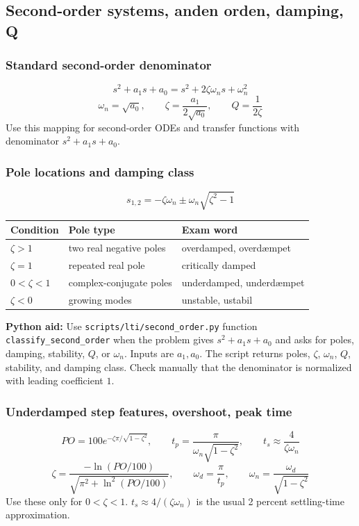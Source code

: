 \subsection{Second-order systems, anden orden, damping, Q}

\subsubsection{Standard second-order denominator}
\[
s^2+a_1s+a_0=s^2+2\zeta\omega_n s+\omega_n^2
\]
\[
\omega_n=\sqrt{a_0},\qquad
\zeta=\frac{a_1}{2\sqrt{a_0}},\qquad
Q=\frac{1}{2\zeta}
\]
Use this mapping for second-order ODEs and transfer functions with denominator \(s^2+a_1s+a_0\).

\subsubsection{Pole locations and damping class}
\[
s_{1,2}=-\zeta\omega_n\pm \omega_n\sqrt{\zeta^2-1}
\]
\begin{tabular}{lll}
\toprule
Condition & Pole type & Exam word \\
\midrule
\(\zeta>1\) & two real negative poles & overdamped, overdæmpet \\
\(\zeta=1\) & repeated real pole & critically damped \\
\(0<\zeta<1\) & complex-conjugate poles & underdamped, underdæmpet \\
\(\zeta<0\) & growing modes & unstable, ustabil \\
\bottomrule
\end{tabular}

\textbf{Python aid:} Use \texttt{scripts/lti/second\_order.py} function \texttt{classify\_second\_order} when the problem gives \(s^2+a_1s+a_0\) and asks for poles, damping, stability, \(Q\), or \(\omega_n\). Inputs are \(a_1,a_0\). The script returns poles, \(\zeta\), \(\omega_n\), \(Q\), stability, and damping class. Check manually that the denominator is normalized with leading coefficient \(1\).

\subsubsection{Underdamped step features, overshoot, peak time}
\[
PO=100e^{-\zeta\pi/\sqrt{1-\zeta^2}},\qquad
t_p=\frac{\pi}{\omega_n\sqrt{1-\zeta^2}},\qquad
t_s\approx\frac{4}{\zeta\omega_n}
\]
\[
\zeta=\frac{-\ln(PO/100)}{\sqrt{\pi^2+\ln^2(PO/100)}},\qquad
\omega_d=\frac{\pi}{t_p},\qquad
\omega_n=\frac{\omega_d}{\sqrt{1-\zeta^2}}
\]
Use these only for \(0<\zeta<1\). \(t_s\approx4/(\zeta\omega_n)\) is the usual 2 percent settling-time approximation.

